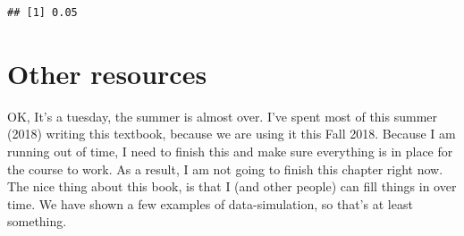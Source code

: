 \documentclass[]{book}
\newenvironment{Shaded}{\begin{snugshade}}{\end{snugshade}}
\newcommand{\CommentTok}[1]{\textcolor[rgb]{0.56,0.35,0.01}{\textit{#1}}}
\newcommand{\ControlFlowTok}[1]{\textcolor[rgb]{0.13,0.29,0.53}{\textbf{#1}}}
\newcommand{\DataTypeTok}[1]{\textcolor[rgb]{0.13,0.29,0.53}{#1}}
\newcommand{\DecValTok}[1]{\textcolor[rgb]{0.00,0.00,0.81}{#1}}
\newcommand{\FloatTok}[1]{\textcolor[rgb]{0.00,0.00,0.81}{#1}}
\newcommand{\KeywordTok}[1]{\textcolor[rgb]{0.13,0.29,0.53}{\textbf{#1}}}
\newcommand{\NormalTok}[1]{#1}
\newcommand{\OperatorTok}[1]{\textcolor[rgb]{0.81,0.36,0.00}{\textbf{#1}}}
\newcommand{\StringTok}[1]{\textcolor[rgb]{0.31,0.60,0.02}{#1}}
\begin{document}
\begin{Shaded}
\end{Shaded}

\begin{verbatim}
## [1] 0.05
\end{verbatim}

\hypertarget{other-resources}{%
\section{Other resources}\label{other-resources}}

OK, It's a tuesday, the summer is almost over. I've spent most of this summer (2018) writing this textbook, because we are using it this Fall 2018. Because I am running out of time, I need to finish this and make sure everything is in place for the course to work. As a result, I am not going to finish this chapter right now. The nice thing about this book, is that I (and other people) can fill things in over time. We have shown a few examples of data-simulation, so that's at least something.
\end{document}
